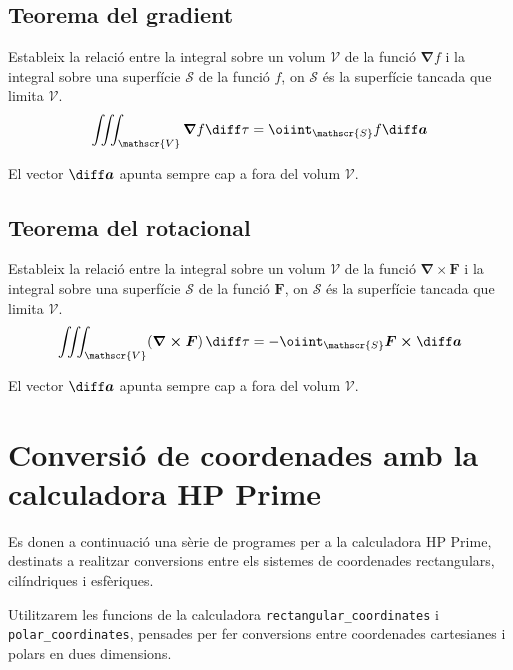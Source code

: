 \documentclass[catalan,a4paper,twoside,11pt]{article}
\begin{document}
\begin{center}
	
	\label{pic:signe-teo-stockes}
\end{center}


\subsection{Teorema del gradient}
Estableix la relació entre la integral sobre un volum $\mathscr{V}$ de la funció $\boldsymbol{\nabla}f$ i la integral sobre una superfície $\mathscr{S}$ de la funció $f$, on $\mathscr{S}$ és la superfície tancada que limita $\mathscr{V}$.
\begin{equation}
    \iiint_\mathscr{V}\boldsymbol{\nabla}f \diff \tau = \oiint_\mathscr{S} f\boldsymbol{\diff a}
\end{equation}

El vector $\boldsymbol{\diff a}$ apunta sempre cap a fora del volum $\mathscr{V}$.

\subsection{Teorema del rotacional}
Estableix la relació entre la integral sobre un volum $\mathscr{V}$ de la funció $\boldsymbol{\nabla\times F}$ i la integral sobre una superfície $\mathscr{S}$ de la funció $\boldsymbol{F}$, on $\mathscr{S}$ és la superfície tancada que limita $\mathscr{V}$.
\begin{equation}
    \iiint_\mathscr{V}(\boldsymbol{\nabla\times F})\,\diff \tau=-\oiint_\mathscr{S}
    \boldsymbol{F\times\diff a}
\end{equation}

El vector $\boldsymbol{\diff a}$ apunta sempre cap a fora del volum $\mathscr{V}$.

\section{Conversió de coordenades amb la calculadora \textsf{HP Prime}}

Es donen a continuació una sèrie de programes per a la calculadora \textsf{HP Prime}, destinats a realitzar conversions entre els  sistemes de coordenades rectangulars, cilíndriques i esfèriques.

Utilitzarem les funcions de la calculadora \texttt{rectangular\_coordinates} i \texttt{polar\_coordinates}, pensades per fer conversions entre coordenades cartesianes i polars en dues dimensions.
\end{document}
